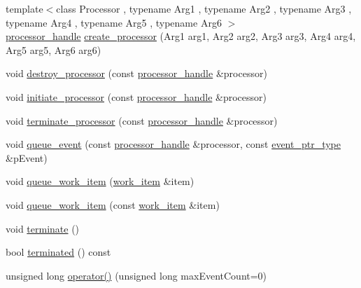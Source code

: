 \begin{DoxyCompactItemize}
\item 
{\footnotesize template$<$class Processor , typename Arg1 , typename Arg2 , typename Arg3 , typename Arg4 , typename Arg5 , typename Arg6 $>$ }\\\mbox{\hyperlink{classboost_1_1statechart_1_1fifo__scheduler_ada526939c16c4f8118bc4d7bbf09ad7d}{processor\+\_\+handle}} \mbox{\hyperlink{classboost_1_1statechart_1_1fifo__scheduler_a02a1f84cd3e6117100418a6d105587e6}{create\+\_\+processor}} (Arg1 arg1, Arg2 arg2, Arg3 arg3, Arg4 arg4, Arg5 arg5, Arg6 arg6)
\item 
void \mbox{\hyperlink{classboost_1_1statechart_1_1fifo__scheduler_a4a25edb5f67e9dd339a6f6cfe6bcc873}{destroy\+\_\+processor}} (const \mbox{\hyperlink{classboost_1_1statechart_1_1fifo__scheduler_ada526939c16c4f8118bc4d7bbf09ad7d}{processor\+\_\+handle}} \&processor)
\item 
void \mbox{\hyperlink{classboost_1_1statechart_1_1fifo__scheduler_a466f16a9904ebdb1123948d3d2b3cd66}{initiate\+\_\+processor}} (const \mbox{\hyperlink{classboost_1_1statechart_1_1fifo__scheduler_ada526939c16c4f8118bc4d7bbf09ad7d}{processor\+\_\+handle}} \&processor)
\item 
void \mbox{\hyperlink{classboost_1_1statechart_1_1fifo__scheduler_a15b81ce74a62a078dd447acfafbf275c}{terminate\+\_\+processor}} (const \mbox{\hyperlink{classboost_1_1statechart_1_1fifo__scheduler_ada526939c16c4f8118bc4d7bbf09ad7d}{processor\+\_\+handle}} \&processor)
\item 
void \mbox{\hyperlink{classboost_1_1statechart_1_1fifo__scheduler_a7b52d93108f6a45503005595ee2feffd}{queue\+\_\+event}} (const \mbox{\hyperlink{classboost_1_1statechart_1_1fifo__scheduler_ada526939c16c4f8118bc4d7bbf09ad7d}{processor\+\_\+handle}} \&processor, const \mbox{\hyperlink{classboost_1_1statechart_1_1fifo__scheduler_a30789ce36779246ebbaf43665289226a}{event\+\_\+ptr\+\_\+type}} \&p\+Event)
\item 
void \mbox{\hyperlink{classboost_1_1statechart_1_1fifo__scheduler_a94caded752eb1e4226b2118e400067a3}{queue\+\_\+work\+\_\+item}} (\mbox{\hyperlink{classboost_1_1statechart_1_1fifo__scheduler_a72ed2c30a2fa295c2e6909ff09754998}{work\+\_\+item}} \&item)
\item 
void \mbox{\hyperlink{classboost_1_1statechart_1_1fifo__scheduler_a28cac5f086d4c677af0fdeb2973859dd}{queue\+\_\+work\+\_\+item}} (const \mbox{\hyperlink{classboost_1_1statechart_1_1fifo__scheduler_a72ed2c30a2fa295c2e6909ff09754998}{work\+\_\+item}} \&item)
\item 
void \mbox{\hyperlink{classboost_1_1statechart_1_1fifo__scheduler_ad8b581c6bc8bee838633b5ed9562b996}{terminate}} ()
\item 
bool \mbox{\hyperlink{classboost_1_1statechart_1_1fifo__scheduler_a231ad7f0d511dcc9be86270a9ace50bd}{terminated}} () const
\item 
unsigned long \mbox{\hyperlink{classboost_1_1statechart_1_1fifo__scheduler_ade6cb1d2bec98187dc1ec8efa834bba7}{operator()}} (unsigned long max\+Event\+Count=0)
\end{DoxyCompactItemize}
